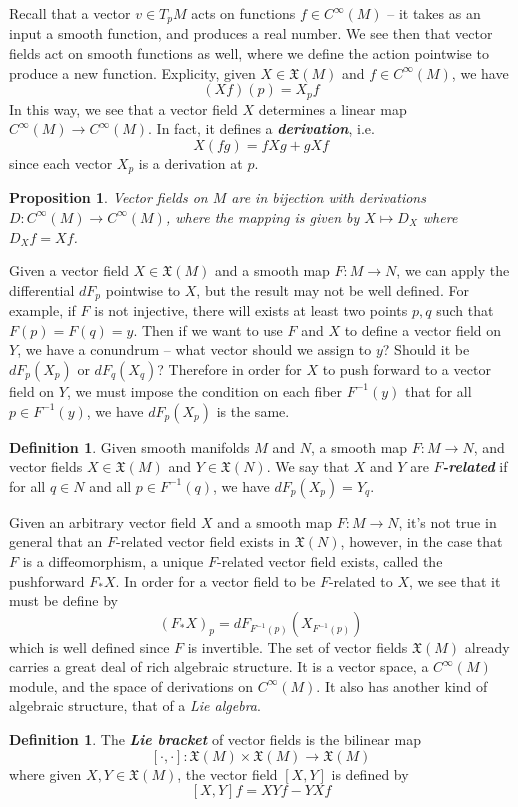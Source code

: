 \documentclass[psamsfonts]{amsart}
\newtheorem{prop}[thm]{Proposition}
\theoremstyle{definition}
\newtheorem{defn}[thm]{Definition}
\theoremstyle{remark}
\newcommand{\ib}[1]{\textbf{\textit{#1}}}
\newcommand{\inv}{^{-1}}
\begin{document}
Recall that a vector $v \in T_pM$ acts on functions $f \in C^\infty(M)$ -- it
takes as an input a smooth function, and produces a real number. We see then
that vector fields act on smooth functions as well, where we define the action
pointwise to produce a new function. Explicity, given $X \in \mathfrak{X}(M)$
and $f \in C^\infty(M)$, we have
\[
(Xf)(p) = X_pf
\]
In this way, we see that a vector field $X$ determines a linear map
$C^\infty(M) \to C^\infty(M)$. In fact, it defines a \ib{derivation},
i.e.
\[
X(fg) = fXg + gXf
\]
since each vector $X_p$ is a derivation at $p$.
%
\begin{prop}
Vector fields on $M$ are in bijection with derivations $D: C^\infty(M) \to C^\infty(M)$,
where the mapping is given by $X \mapsto D_X$ where $D_Xf = Xf$.
\end{prop}
%
Given a vector field $X \in \mathfrak{X}(M)$ and a smooth map $F : M \to N$,
we can apply the differential $dF_p$ pointwise to $X$, but the result may
not be well defined. For example, if $F$ is not injective, there will
exists at least two points $p,q$ such that $F(p) = F(q) = y$. Then if we want
to use $F$ and $X$ to define a vector field on $Y$, we have a conundrum --
what vector should we assign to $y$? Should it be $dF_p(X_p)$ or $dF_q(X_q)$?
Therefore in order for $X$ to push forward to a vector field on $Y$, we must
impose the condition on each fiber $F\inv(y)$ that for all $p \in F\inv(y)$,
we have $dF_p(X_p)$ is the same.
%
\begin{defn}
Given smooth manifolds $M$ and $N$, a smooth map $F: M \to N$, and vector
fields $X \in \mathfrak{X}(M)$ and $Y \in \mathfrak{X}(N)$. We say that
$X$ and $Y$ are \ib{$F$-related} if for all $q \in N$ and all $p \in F\inv(q)$,
we have $dF_p(X_p) = Y_q$.
\end{defn}
%
Given an arbitrary vector field $X$ and a smooth map $F: M \to N$, it's not true
in general that an $F$-related vector field exists in $\mathfrak{X}(N)$, however,
in the case that $F$ is a diffeomorphism, a unique $F$-related vector field
exists, called the pushforward $F_*X$. In order for a vector field to be $F$-related
to $X$, we see that it must be define by
\[
(F_*X)_p = dF_{F\inv(p)}(X_{F\inv(p)})
\]
which is well defined since $F$ is invertible.
%
The set of vector fields $\mathfrak{X}(M)$ already carries a great deal of
rich algebraic structure. It is a vector space, a $C^\infty(M)$ module, and
the space of derivations on $C^\infty(M)$. It also has another kind of
algebraic structure, that of a \emph{Lie algebra}.
%
\begin{defn}
The \ib{Lie bracket} of vector fields is the bilinear map
\[
[\cdot,\cdot] : \mathfrak{X}(M) \times \mathfrak{X}(M) \to \mathfrak{X}(M)
\]
where given $X,Y \in \mathfrak{X}(M)$, the vector field $[X,Y]$ is defined by
\[
[X,Y]f = XYf - YXf
\]
\end{defn}
\end{document}
